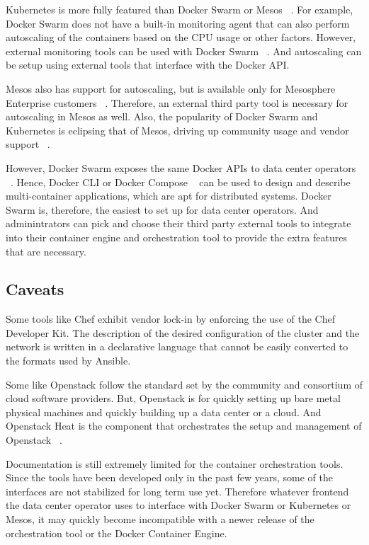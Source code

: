 \documentclass[10pt,twocolumn]{article}
\begin{document}
Kubernetes is more fully featured than Docker Swarm or Mesos ~\cite{kubernetes}.
For example, Docker Swarm does not have a built-in monitoring agent that can also perform autoscaling of the containers based on the CPU usage or other factors.
However, external monitoring tools can be used with Docker Swarm ~\cite{docker_swarm}.
And autoscaling can be setup using external tools that interface with the Docker API.

Mesos also has support for autoscaling, but is available only for Mesosphere Enterprise customers ~\cite{mesosphere}.
Therefore, an external third party tool is necessary for autoscaling in Mesos as well.
Also, the popularity of Docker Swarm and Kubernetes is eclipsing that of Mesos, driving up community usage and vendor support ~\cite{openhub}.

However, Docker Swarm exposes the same Docker APIs to data center operators ~\cite{docker_swarm}.
Hence, Docker CLI or Docker Compose ~\cite{docker_compose} can be used to design and describe multi-container applications, which are apt for distributed systems.
Docker Swarm is, therefore, the easiest to set up for data center operators.
And adminintrators can pick and choose their third party external tools to integrate into their container engine and orchestration tool to provide the extra features that are necessary.

\subsection{Caveats}

Some tools like Chef exhibit vendor lock-in by enforcing the use of the Chef Developer Kit.
The description of the desired configuration of the cluster and the network is written in a declarative language that cannot be easily converted to the formats used by Ansible.

Some like Openstack follow the standard set by the community and consortium of cloud software providers.
But, Openstack is for quickly setting up bare metal physical machines and quickly building up a data center or a cloud.
And Openstack Heat is the component that orchestrates the setup and management of Openstack ~\cite{openstack}.

Documentation is still extremely limited for the container orchestration tools.
Since the tools have been developed only in the past few years, some of the interfaces are not stabilized for long term use yet.
Therefore whatever frontend the data center operator uses to interface with Docker Swarm or Kubernetes or Mesos, it may quickly become incompatible with a newer release of the orchestration tool or the Docker Container Engine.
\end{document}
